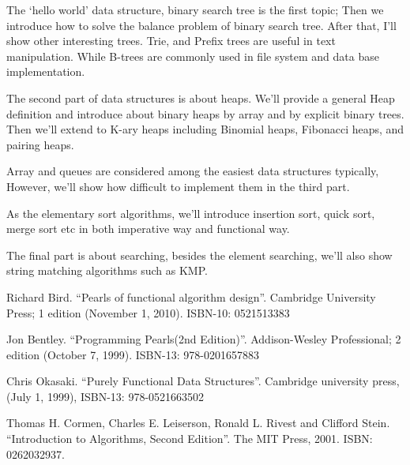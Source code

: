 \documentclass[b5paper]{article}
\begin{document}
The `hello world' data structure, binary search tree is the
first topic; Then we introduce how to solve the balance problem
of binary search tree. After that, I'll show other interesting
trees. Trie, and Prefix trees are useful in text manipulation.
While B-trees are commonly used in file system and data base
implementation.

The second part of data structures is about heaps. We'll
provide a general Heap definition and introduce about binary
heaps by array and by explicit binary trees. Then we'll
extend to K-ary heaps including Binomial heaps, Fibonacci
heaps, and pairing heaps.

Array and queues are considered among the easiest data structures
typically, However, we'll show how difficult to implement
them in the third part.

As the elementary sort algorithms, we'll introduce insertion
sort, quick sort, merge sort etc in both imperative way
and functional way.

The final part is about searching, besides the element
searching, we'll also show string matching algorithms
such as KMP.

\begin{thebibliography}{99}

Richard Bird. ``Pearls of functional algorithm design''. Cambridge University Press; 1 edition (November 1, 2010). ISBN-10: 0521513383

Jon Bentley. ``Programming Pearls(2nd Edition)''. Addison-Wesley Professional; 2 edition (October 7, 1999). ISBN-13: 978-0201657883

Chris Okasaki. ``Purely Functional Data Structures''. Cambridge university press, (July 1, 1999), ISBN-13: 978-0521663502

Thomas H. Cormen, Charles E. Leiserson, Ronald L. Rivest and Clifford Stein. ``Introduction to Algorithms, Second Edition''. The MIT Press, 2001. ISBN: 0262032937.

\end{thebibliography}

\ifx\wholebook\relax \else
\end{document}
